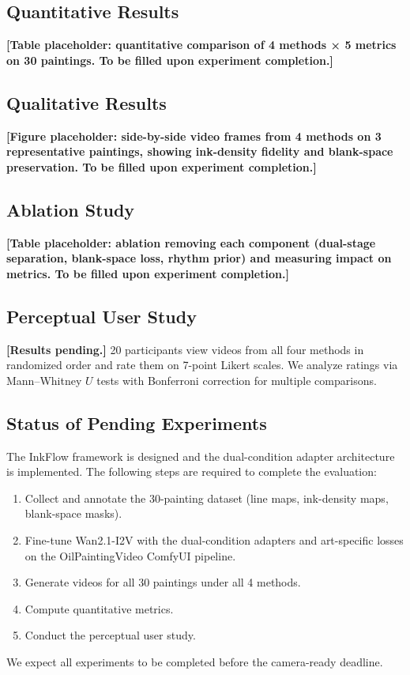 \subsection{Quantitative Results}

\textbf{[Table placeholder: quantitative comparison of 4 methods ×
5 metrics on 30 paintings. To be filled upon experiment completion.]}

\subsection{Qualitative Results}

\textbf{[Figure placeholder: side-by-side video frames from 4 methods
on 3 representative paintings, showing ink-density fidelity and
blank-space preservation. To be filled upon experiment completion.]}

\subsection{Ablation Study}

\textbf{[Table placeholder: ablation removing each component
(dual-stage separation, blank-space loss, rhythm prior) and
measuring impact on metrics. To be filled upon experiment
completion.]}

\subsection{Perceptual User Study}

\textbf{[Results pending.]} 20 participants view videos from all
four methods in randomized order and rate them on 7-point Likert
scales. We analyze ratings via Mann--Whitney $U$ tests with
Bonferroni correction for multiple comparisons.

\subsection{Status of Pending Experiments}

The InkFlow framework is designed and the dual-condition adapter
architecture is implemented. The following steps are required to
complete the evaluation:
\begin{enumerate}
    \item Collect and annotate the 30-painting dataset (line maps,
    ink-density maps, blank-space masks).
    \item Fine-tune Wan2.1-I2V with the dual-condition adapters and
    art-specific losses on the OilPaintingVideo ComfyUI pipeline.
    \item Generate videos for all 30 paintings under all 4 methods.
    \item Compute quantitative metrics.
    \item Conduct the perceptual user study.
\end{enumerate}
We expect all experiments to be completed before the camera-ready
deadline.
